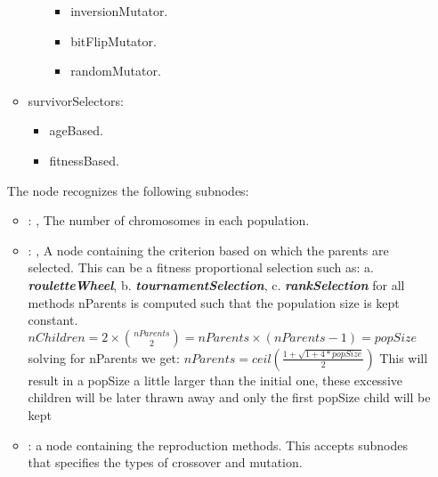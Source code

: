 \begin{itemize}
\begin{itemize}
\begin{itemize}
\begin{itemize}
      \item inversionMutator.
      \item bitFlipMutator.
      \item randomMutator.
      \end{itemize}                                                                    \end{itemize}
      \item survivorSelectors:
      \begin{itemize}                                                                        \item
      ageBased.                                                                        \item
      fitnessBased.
      \end{itemize}                                                \end{itemize}

      The  node recognizes the following subnodes:
      \begin{itemize}
        \item {}: , 
          The number of chromosomes in each population.

        \item {}: , 
          A node containing the criterion based on which the parents are selected. This can be a
          fitness proportional selection such as:                   a.
          \textbf{\textit{rouletteWheel}},                   b.
          \textbf{\textit{tournamentSelection}},                   c.
          \textbf{\textit{rankSelection}}                   for all methods nParents is computed
          such that the population size is kept constant.                   $nChildren = 2 \times
          {nParents \choose 2} = nParents \times (nParents-1) = popSize$                   solving
          for nParents we get:                   $nParents = ceil(\frac{1 + \sqrt{1+4*popSize}}{2})$
          This will result in a popSize a little larger than the initial one, these excessive
          children will be later thrawn away and only the first popSize child will be kept

        \item {}:
          a node containing the reproduction methods.                   This accepts subnodes that
          specifies the types of crossover and mutation.


\end{itemize}
\end{itemize}

